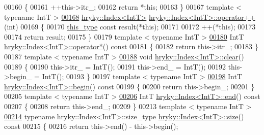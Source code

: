 \begin{DoxyCode}
00160 \{
00161     ++this->itr\_;
00162     \textcolor{keywordflow}{return} *\textcolor{keyword}{this};
00163 \}
00167 \textcolor{keyword}{template} < \textcolor{keyword}{typename} IntT >
\hypertarget{index_8h_source_l00168}{}\hyperlink{classhryky_1_1_index_af38e78aaf394dfdbfaf2d8b031ac7aec}{00168} \hyperlink{classhryky_1_1_index}{hryky::Index<IntT>} \hyperlink{classhryky_1_1_index}{hryky::Index<IntT>::operator++}(\textcolor{keywordtype}{int})
00169 \{
00170     \hyperlink{classhryky_1_1_index}{this_type} \textcolor{keyword}{const} result(*\textcolor{keyword}{this});
00171 
00172     ++(*this);
00173 
00174     \textcolor{keywordflow}{return} result;
00175 \}
00179 \textcolor{keyword}{template} < \textcolor{keyword}{typename} IntT >
\hypertarget{index_8h_source_l00180}{}\hyperlink{classhryky_1_1_index_ad792dbfd3ae8e67b3e0007150b9e8e36}{00180} IntT \hyperlink{classhryky_1_1_index}{hryky::Index<IntT>::operator*}()\textcolor{keyword}{ const}
00181 \textcolor{keyword}{}\{
00182     \textcolor{keywordflow}{return} this->itr\_;
00183 \}
00187 \textcolor{keyword}{template} < \textcolor{keyword}{typename} IntT >
\hypertarget{index_8h_source_l00188}{}\hyperlink{classhryky_1_1_index_aaa1f68afe5dff5a7df14812ff16fd13d}{00188} \textcolor{keywordtype}{void} \hyperlink{namespacehryky_aa201297ea9530da954a7230be71cc19d}{hryky::Index<IntT>::clear}()
00189 \{
00190     this->itr\_ = IntT();
00191     this->end\_ = IntT();
00192     this->begin\_ = IntT();
00193 \}
00197 \textcolor{keyword}{template} < \textcolor{keyword}{typename} IntT >
\hypertarget{index_8h_source_l00198}{}\hyperlink{classhryky_1_1_index_a26c8fe53f07dbc3a0f932c594f8afab3}{00198} IntT \hyperlink{classhryky_1_1_index}{hryky::Index<IntT>::begin}()\textcolor{keyword}{ const}
00199 \textcolor{keyword}{}\{
00200     \textcolor{keywordflow}{return} this->begin\_;
00201 \}
00205 \textcolor{keyword}{template} < \textcolor{keyword}{typename} IntT >
\hypertarget{index_8h_source_l00206}{}\hyperlink{classhryky_1_1_index_a9c9aa7850b38616636afd3148e9bb5f1}{00206} IntT \hyperlink{classhryky_1_1_index}{hryky::Index<IntT>::end}()\textcolor{keyword}{ const}
00207 \textcolor{keyword}{}\{
00208     \textcolor{keywordflow}{return} this->end\_;
00209 \}
00213 \textcolor{keyword}{template} < \textcolor{keyword}{typename} IntT >
\hypertarget{index_8h_source_l00214}{}\hyperlink{classhryky_1_1_index_acbbc20fade7bd82b7ce253ef052a0e9c}{00214} \textcolor{keyword}{typename} hryky::Index<IntT>::size\_type \hyperlink{classhryky_1_1_index}{hryky::Index<IntT>::size}()\textcolor{keyword}{ const}
00215 \textcolor{keyword}{}\{
00216     \textcolor{keywordflow}{return} this->end() - this->begin();

\end{DoxyCode}
